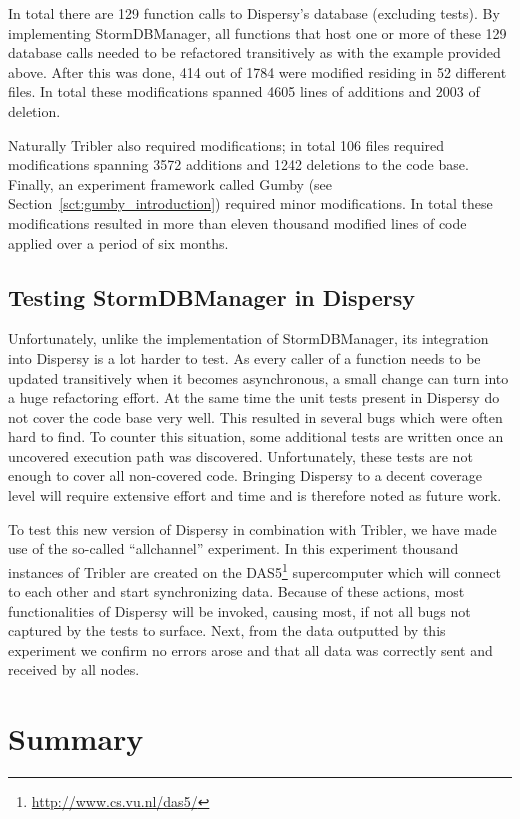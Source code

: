 In total there are 129 function calls to Dispersy's database (excluding tests).
By implementing StormDBManager, all functions that host one or more of these 129 database calls needed to be refactored transitively as with the example provided above.
After this was done, 414 out of 1784 were modified residing in 52 different files.
In total these modifications spanned 4605 lines of additions and 2003 of deletion.

Naturally Tribler also required modifications; in total 106 files required modifications spanning 3572 additions and 1242 deletions to the code base.
Finally, an experiment framework called Gumby (see Section~\ref{sct:gumby_introduction}) required minor modifications.
In total these modifications resulted in more than eleven thousand modified lines of code applied over a period of six months.

\subsection{Testing StormDBManager in Dispersy}

Unfortunately, unlike the implementation of StormDBManager, its integration into Dispersy is a lot harder to test.
As every caller of a function needs to be updated transitively when it becomes asynchronous, a small change can turn into a huge refactoring effort.
At the same time the unit tests present in Dispersy do not cover the code base very well.
This resulted in several bugs which were often hard to find.
To counter this situation, some additional tests are written once an uncovered execution path was discovered.
Unfortunately, these tests are not enough to cover all non-covered code.
Bringing Dispersy to a decent coverage level will require extensive effort and time and is therefore noted as future work.
 
To test this new version of Dispersy in combination with Tribler, we have made use of the so-called \enquote{allchannel} experiment.
In this experiment thousand instances of Tribler are created on the DAS5\footnote{\url{http://www.cs.vu.nl/das5/}} supercomputer which will connect to each other and start synchronizing data.
Because of these actions, most functionalities of Dispersy will be invoked, causing most, if not all bugs not captured by the tests to surface.
Next, from the data outputted by this experiment we confirm no errors arose and that all data was correctly sent and received by all nodes.

\section{Summary}

